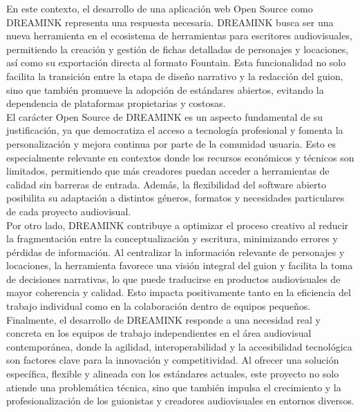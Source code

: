 \documentclass[12pt]{article}
\begin{document}
	En este contexto, el desarrollo de una aplicación web Open Source como DREAMINK representa una respuesta necesaria. DREAMINK busca ser una nueva herramienta en el ecosistema de herramientas para escritores audiovisuales, permitiendo la creación y gestión de fichas detalladas de personajes y locaciones, así como su exportación directa al formato Fountain. Esta funcionalidad no solo facilita la transición entre la etapa de diseño narrativo y la redacción del guion, sino que también promueve la adopción de estándares abiertos, evitando la dependencia de plataformas propietarias y costosas.\\

	El carácter Open Source de DREAMINK es un aspecto fundamental de su justificación, ya que democratiza el acceso a tecnología profesional y fomenta la personalización y mejora continua por parte de la comunidad usuaria. Esto es especialmente relevante en contextos donde los recursos económicos y técnicos son limitados, permitiendo que más creadores puedan acceder a herramientas de calidad sin barreras de entrada. Además, la flexibilidad del software abierto posibilita su adaptación a distintos géneros, formatos y necesidades particulares de cada proyecto audiovisual.\\

	Por otro lado, DREAMINK contribuye a optimizar el proceso creativo al reducir la fragmentación entre la conceptualización y escritura, minimizando errores y pérdidas de información. Al centralizar la información relevante de personajes y locaciones, la herramienta favorece una visión integral del guion y facilita la toma de decisiones narrativas, lo que puede traducirse en productos audiovisuales de mayor coherencia y calidad. Esto impacta positivamente tanto en la eficiencia del trabajo individual como en la colaboración dentro de equipos pequeños.\\

	Finalmente, el desarrollo de DREAMINK responde a una necesidad real y concreta en los equipos de trabajo independientes en el área audiovisual contemporánea, donde la agilidad, interoperabilidad y la accesibilidad tecnológica son factores clave para la innovación y competitividad. Al ofrecer una solución específica, flexible y alineada con los estándares actuales, este proyecto no solo atiende una problemática técnica, sino que también impulsa el crecimiento y la profesionalización de los guionistas y creadores audiovisuales en entornos diversos.\\
\end{document}
